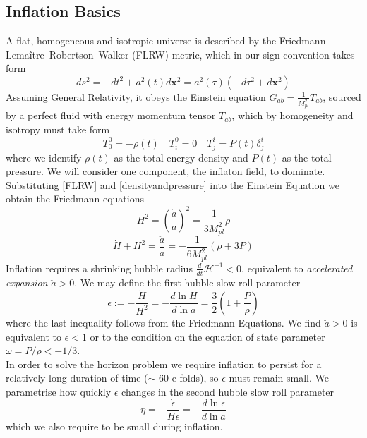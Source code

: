 \documentclass[a4paper,10pt]{article}
\renewcommand{\v}[1]{\mathbf{#1}}
\newcommand{\Mp}{M_{pl}}
\begin{document}
\subsection{Inflation Basics}
A flat, homogeneous and isotropic universe is described by the Friedmann–Lemaître–Robertson–Walker (FLRW) metric, which in our sign convention takes form
\begin{equation}
\label{FLRW}
ds^2 = - dt^2 + a^2(t)d\v{x}^2 = a^2(\tau)(-d\tau^2+d\v{x}^2)
\end{equation}
Assuming General Relativity, it obeys the Einstein equation $G_{ab} = \frac{1}{\Mp^2} T_{ab}$, sourced by a perfect fluid with energy momentum tensor $T_{ab}$, which by homogeneity and isotropy must take form
\begin{equation}
\label{densityandpressure}
T^0_0 = - \rho(t) \quad T^0_i = 0 \quad T^i_j = P(t)\delta^i_j
\end{equation}
where we  identify $\rho(t)$ as the total energy density and $P(t)$ as the total pressure. We will consider one component, the inflaton field, to dominate.  Substituting \ref{FLRW} and \ref{densityandpressure} into the Einstein Equation we obtain the Friedmann equations
\begin{equation}
H^2 = \left(\frac{\dot{a}}{a}\right)^2 = \frac{1}{3\Mp^2}\rho
\tag{F1}
\label{F1}
\end{equation}
\begin{equation}
\dot{H} + H^2 = \frac{\ddot{a}}{a} = -\frac{1}{6\Mp^2}(\rho + 3P)
\tag{F2}
\label{F2}
\end{equation}
Inflation requires a shrinking hubble radius $\frac{d}{dt}\mathcal{H}^{-1}<0$, equivalent to \textit{accelerated expansion} $\ddot{a} >0$. We may define the first hubble slow roll parameter 
\begin{equation}
\label{epsilon}
\epsilon := -\frac{\dot{H}}{H^2} = -\frac{d\ln{H}}{d\ln{a}} = \frac{3}{2}\left(1+\frac{P}{\rho}\right)
\end{equation}
where the last inequality follows from the Friedmann Equations. We find $\ddot{a} >0$ is equivalent to $\epsilon<1$ or to the condition on the equation of state parameter $\omega=P/\rho < -1/3$.\\ 

In order to solve the horizon problem we require inflation to persist for a relatively long duration of time ($\sim$ 60 e-folds), so $\epsilon$ must remain small. We parametrise how quickly $\epsilon$ changes in the second hubble slow roll parameter 
\begin{equation}
\eta = -\frac{\dot{\epsilon}}{H\epsilon} = -\frac{d\ln{\epsilon}}{d\ln{a}}
\end{equation}
which we also require to be small during inflation.
\end{document}

